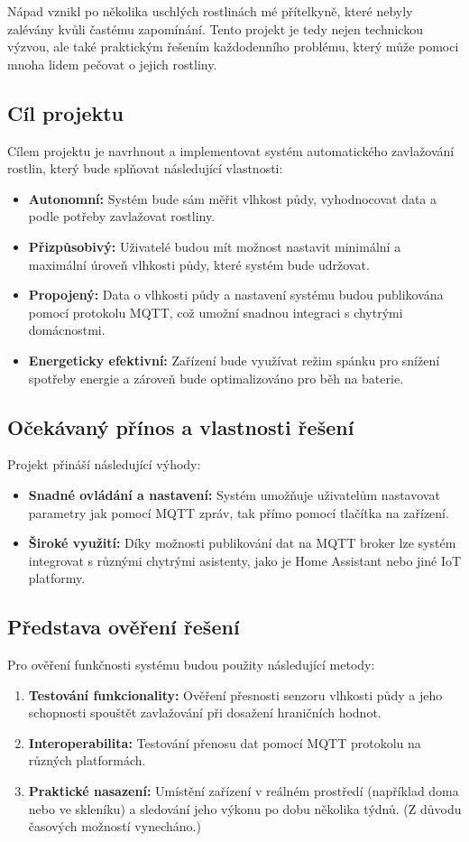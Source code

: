 \documentclass[a4paper, 11pt]{article}
\begin{document}
Nápad vznikl po několika uschlých rostlinách mé přítelkyně, které nebyly zalévány kvůli častému zapomínání. Tento projekt je tedy nejen technickou výzvou, 
ale také praktickým řešením každodenního problému, který může pomoci mnoha lidem pečovat o jejich rostliny.

\subsection{Cíl projektu}
Cílem projektu je navrhnout a implementovat systém automatického zavlažování rostlin, který bude splňovat následující vlastnosti:
\begin{itemize}
    \item \textbf{Autonomní:} Systém bude sám měřit vlhkost půdy, vyhodnocovat data a podle potřeby zavlažovat rostliny.
    \item \textbf{Přizpůsobivý:} Uživatelé budou mít možnost nastavit minimální a maximální úroveň vlhkosti půdy, které systém bude udržovat.
    \item \textbf{Propojený:} Data o vlhkosti půdy a nastavení systému budou publikována pomocí protokolu MQTT, což umožní snadnou integraci s chytrými domácnostmi.
    \item \textbf{Energeticky efektivní:} Zařízení bude využívat režim spánku pro snížení spotřeby energie a zároveň bude optimalizováno pro běh na baterie.
\end{itemize}

\subsection{Očekávaný přínos a vlastnosti řešení}
Projekt přináší následující výhody:
\begin{itemize}
    \item \textbf{Snadné ovládání a nastavení:} Systém umožňuje uživatelům nastavovat parametry jak pomocí MQTT zpráv, tak přímo pomocí tlačítka na zařízení.
    \item \textbf{Široké využití:} Díky možnosti publikování dat na MQTT broker lze systém integrovat s různými chytrými asistenty, jako je Home Assistant nebo jiné IoT platformy.
\end{itemize}

\subsection{Představa ověření řešení}
Pro ověření funkčnosti systému budou použity následující metody:
\begin{enumerate}
    \item \textbf{Testování funkcionality:} Ověření přesnosti senzoru vlhkosti půdy a jeho schopnosti spouštět zavlažování při dosažení hraničních hodnot.
    \item \textbf{Interoperabilita:} Testování přenosu dat pomocí MQTT protokolu na různých platformách.
    \item \textbf{Praktické nasazení:} Umístění zařízení v reálném prostředí (například doma nebo ve skleníku) a sledování jeho výkonu po dobu několika týdnů. (Z důvodu časových možností vynecháno.)
\end{enumerate}
\end{document}
